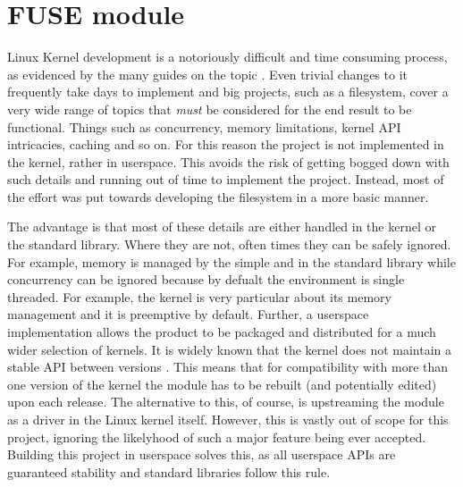     \section{FUSE module}
        \label{sec:FUSE}

        Linux Kernel development is a notoriously difficult and time consuming
        process, as evidenced by the many guides on the topic
        \cite{kernelnewbies_developer, Linux_howto}. Even trivial changes
        to it frequently take days to implement and big projects, such as a
        filesystem, cover a very wide range of topics that \textit{must} be
        considered for the end result to be functional. Things such as
        concurrency, memory limitations, kernel API intricacies, caching and so
        on. For this reason the project is not implemented in the kernel,
        rather in userspace. This avoids the risk of getting bogged down with
        such details and running out of time to implement the project. Instead,
        most of the effort was put towards developing the filesystem in a more
        basic manner.

        The advantage is that most of these details are either handled in the
        kernel or the standard library. Where they are not, often times they
        can be safely ignored. For example, memory is managed by the simple
         and  in the standard library while
        concurrency can be ignored because by defualt the environment is single
        threaded. For example, the kernel is very particular about its memory
        management and it is preemptive by default. Further, a userspace
        implementation allows the product to be packaged and distributed for a
        much wider selection of kernels. It is widely known that the kernel
        does not maintain a stable API between versions
        \cite{Linux_stable_api}. This means that for compatibility with more
        than one version of the kernel the module has to be rebuilt (and
        potentially edited) upon each release. The alternative to this, of
        course, is upstreaming the module as a driver in the Linux kernel
        itself. However, this is vastly out of scope for this project, ignoring
        the likelyhood of such a major feature being ever accepted. Building
        this project in userspace solves this, as all userspace APIs are
        guaranteed stability \cite{never_break_userspace} and standard
        libraries follow this rule.

